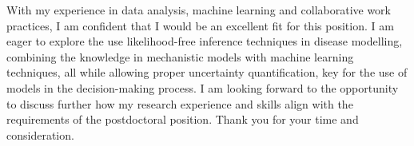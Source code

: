 \documentclass[11pt, a4paper]{awesome-cv}
\begin{document}
\begin{cvletter}
With my experience in data analysis, machine learning and collaborative work practices, I am confident that I would be an excellent fit for this position. I am eager to explore the use likelihood-free inference techniques in disease modelling, combining the knowledge in mechanistic models with machine learning techniques, all while allowing proper uncertainty quantification, key for the use of models in the decision-making process. I am looking forward to the opportunity to discuss further how my research experience and skills align with the requirements of the postdoctoral position. Thank you for your time and consideration.

\end{cvletter}


\makeletterclosing
\end{document}
